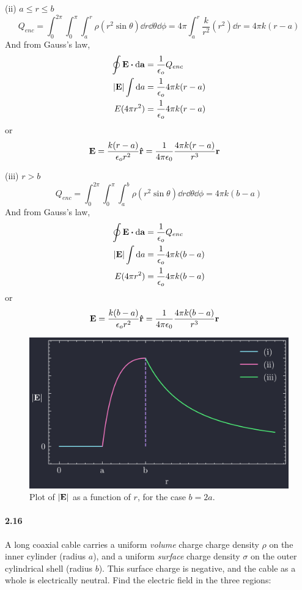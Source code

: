 \documentclass[../main.tex]{subfiles}
\begin{document}
(ii) \(a\leq r \leq b\)
\[ Q_{enc} = \int_0^{2\pi} \int_0^\pi \int_a^r \rho (r^2 \sin\theta) \dd{r} \dd{\theta} \dd{\phi}
= 4\pi \int_a^r \frac{k}{r^2} (r^2) \dd{r} = 4\pi k (r - a) \]
And from Gauss's law,
\begin{align*}
    \oint \vb{E} \vdot \dd{\vb{a}} &= \frac{1}{\epsilon_o} Q_{enc} \\
    \abs{\vb{E}} \int \dd{a} &= \frac{1}{\epsilon_o} 4\pi k (r - a) \\
    E (4\pi r^2) &= \frac{1}{\epsilon_o} 4\pi k (r - a)
\end{align*}
or 
\begin{align*}
    \vb{E} &= \frac{k (r - a)}{\epsilon_o r^2} \vu{r} = \frac{1}{4\pi\epsilon_0} \frac{4\pi k(r - a)}{r^3} \vb{r}
\end{align*}

(iii) \(r>b\)
\[ Q_{enc} = \int_0^{2\pi} \int_0^\pi \int_a^b \rho (r^2 \sin\theta) \dd{r} \dd{\theta} \dd{\phi}
= 4\pi k (b - a) \]
And from Gauss's law,
\begin{align*}
    \oint \vb{E} \vdot \dd{\vb{a}} &= \frac{1}{\epsilon_o} Q_{enc} \\
    \abs{\vb{E}} \int \dd{a} &= \frac{1}{\epsilon_o} 4\pi k (b - a) \\
    E (4\pi r^2) &= \frac{1}{\epsilon_o} 4\pi k (b - a)
\end{align*}
or
\begin{align*}
    \vb{E} &= \frac{k (b - a)}{\epsilon_o r^2} \vu{r} = \frac{1}{4\pi\epsilon_0} \frac{4\pi k(b - a)}{r^3} \vb{r}
\end{align*}
\begin{figure}[ht]
    \centering
    \includegraphics[width=0.5\linewidth]{images/fig2_15.png}
    \captionsetup{width=0.8\linewidth}
    \caption{Plot of $\abs{\vb{E}}$ as a function of $r$, for the case $b = 2a$.}
    \label{fig:2_15}
\end{figure}

\paragraph{2.16}
A long coaxial cable carries a uniform \emph{volume} charge charge density $\rho$ on the inner
cylinder (radius $a$), and a uniform \emph{surface} charge density $\sigma$ on the outer cylindrical
shell (radius $b$). This surface charge is negative, and the cable as a whole is electrically
neutral. Find the electric field in the three regions:
\end{document}
